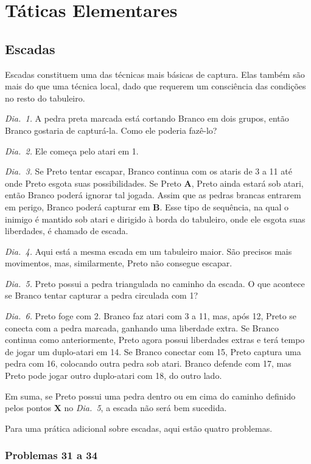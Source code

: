 \chapter{Táticas Elementares}

\section{Escadas}

Escadas constituem uma das técnicas mais básicas de captura. Elas também são mais do que uma técnica local, dado que requerem um consciência das condições no resto do tabuleiro.

\emph{Dia.\@~1.} A pedra preta marcada está cortando Branco em dois grupos, então Branco gostaria de capturá-la. Como ele poderia fazê-lo?

\emph{Dia.\@~2.} Ele começa pelo atari em 1.

\emph{Dia.\@~3.} Se Preto tentar escapar, Branco continua com os ataris de 3 a 11 até onde Preto esgota suas possibilidades. Se Preto \textbf{A}, Preto ainda estará sob atari, então Branco poderá ignorar tal jogada. Assim que as pedras brancas entrarem em perigo, Branco poderá capturar em \textbf{B}. Esse tipo de sequência, na qual o inimigo é mantido sob atari e dirigido à borda do tabuleiro, onde ele esgota suas liberdades, é chamado de escada.

\emph{Dia.\@~4.} Aqui está a mesma escada em um tabuleiro maior. São precisos mais movimentos, mas, similarmente, Preto não consegue escapar.

\emph{Dia.\@~5.} Preto possui a pedra triangulada no caminho da escada. O que acontece se Branco tentar capturar a pedra circulada com 1?

\emph{Dia.\@~6.} Preto foge com 2. Branco faz atari com 3 a 11, mas, após 12, Preto se conecta com a pedra marcada, ganhando uma liberdade extra. Se Branco continua como anteriormente, Preto agora possui liberdades extras e terá tempo de jogar um duplo-atari em 14. Se Branco conectar com 15, Preto captura uma pedra com 16, colocando outra pedra sob atari. Branco defende com 17, mas Preto pode jogar outro duplo-atari com 18, do outro lado.

Em suma, se Preto possui uma pedra dentro ou em cima do caminho definido pelos pontos \textbf{X} no \emph{Dia.\@~5}, a escada não será bem sucedida.

Para uma prática adicional sobre escadas, aqui estão quatro problemas.

\subsection{Problemas 31 a 34}

